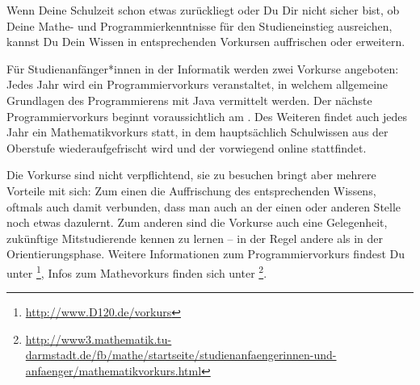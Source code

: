 {Wenn Deine Schulzeit schon etwas zurückliegt oder Du Dir nicht sicher bist, ob Deine Mathe- und Programmierkenntnisse für den Studieneinstieg ausreichen, kannst Du Dein Wissen in entsprechenden Vorkursen auffrischen oder erweitern.
}{Für Studienanfänger*innen in der Informatik werden zwei Vorkurse angeboten: Jedes Jahr wird ein Programmiervorkurs veranstaltet, in welchem allgemeine Grundlagen des Programmierens mit Java vermittelt werden. Der nächste Programmiervorkurs beginnt voraussichtlich am \vorkurs. Des Weiteren findet auch jedes Jahr ein Mathematikvorkurs statt, in dem hauptsächlich Schulwissen aus der Oberstufe wiederaufgefrischt wird und der vorwiegend online stattfindet. 

Die Vorkurse sind nicht verpflichtend, sie zu besuchen bringt aber mehrere Vorteile mit sich: Zum einen die Auffrischung des entsprechenden Wissens, oftmals auch damit verbunden, dass man auch an der einen oder anderen Stelle noch etwas dazulernt. Zum anderen sind die Vorkurse auch eine Gelegenheit, zukünftige Mitstudierende kennen zu lernen – in der Regel andere als in der Orientierungsphase.
Weitere Informationen zum Programmiervorkurs findest Du unter \footnote{\url{http://www.D120.de/vorkurs}}, Infos zum Mathevorkurs finden sich unter \footnote{\url{http://www3.mathematik.tu-darmstadt.de/fb/mathe/startseite/studienanfaengerinnen-und-anfaenger/mathematikvorkurs.html}}.
}{}

\newpage